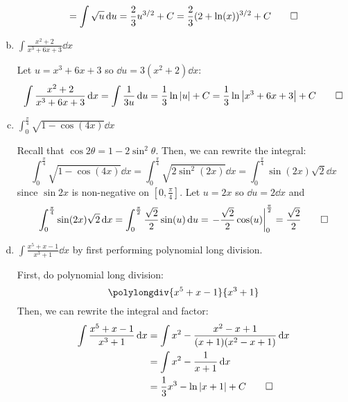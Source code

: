 \documentclass{agony}
\begin{document}
\begin{enumerate}[(a)]
\begin{sol}
\begin{equation*}
            = \int \sqrt{u} \dd{u}
            = \frac{2}{3}u^{3/2} + C
            = \frac{2}{3}(2+\ln(x))^{3/2} + C \qedhere
          \end{equation*}
        \end{sol}
  \item $\displaystyle\int \frac{x^2+2}{x^3+6x+3} \dd{x}$
        \begin{sol}
          Let $u = x^3 + 6x + 3$ so $\dd{u} = 3(x^2+2)\dd{x}$:
          \begin{equation*}
            \int \frac{x^2+2}{x^3+6x+3} \dd{x}
            = \int \frac{1}{3u} \dd{u}
            = \frac{1}{3} \ln\abs{u} + C
            = \frac{1}{3} \ln\abs{x^3 + 6x + 3} + C \qedhere
          \end{equation*}
        \end{sol}
  \item $\displaystyle\int_0^{\frac\pi4} \sqrt{1-\cos(4x)} \dd{x}$
  \begin{sol}
    Recall that $\cos 2\theta = 1-2\sin^2\theta$.
    Then, we can rewrite the integral:
    \begin{equation*}
      \int_0^{\frac\pi4} \sqrt{1-\cos(4x)} \dd{x}
      = \int_0^{\frac\pi4} \sqrt{2\sin^2(2x)} \dd{x}
      = \int_0^{\frac\pi4} \sin(2x)\sqrt{2} \dd{x}
    \end{equation*}
    since $\sin 2x$ is non-negative on $[0,\frac\pi4]$.
    Let $u = 2x$ so $\dd{u} = 2\dd{x}$ and
    \begin{equation*}
      \int_0^{\frac\pi4} \sin(2x)\sqrt{2} \dd{x}
      = \int_0^{\frac\pi2} \frac{\sqrt{2}}{2} \sin(u) \dd{u}
      = \left.-\frac{\sqrt{2}}{2}\cos(u)\right|_{0}^{\frac\pi2}
      = \frac{\sqrt{2}}{2} \qedhere
    \end{equation*}
  \end{sol}
  \item $\displaystyle\int \frac{x^5+x-1}{x^3+1} \dd{x}$ by first performing polynomial long division.
        \begin{sol}
          First, do polynomial long division:
          \[ \polylongdiv{x^5+x-1}{x^3+1} \]
          Then, we can rewrite the integral and factor:
          \begin{align*}
            \int \frac{x^5+x-1}{x^3+1} \dd{x}
             & = \int x^2 - \frac{x^2 - x + 1}{(x+1)(x^2 - x + 1)} \dd{x} \\
             & = \int x^2 - \frac{1}{x+1} \dd{x}                          \\
             & = \frac{1}{3}x^3 - \ln\abs{x+1} + C \qedhere
          \end{align*}
        \end{sol}
\end{enumerate}
\end{document}

